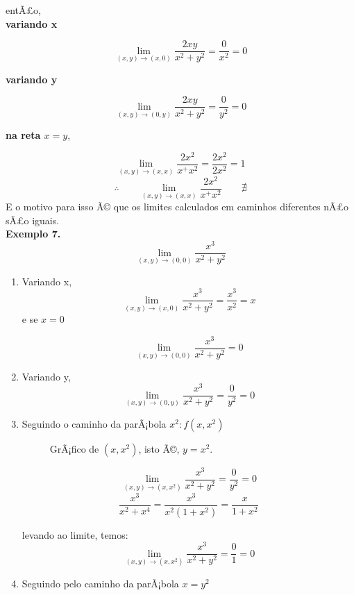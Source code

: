 entÃ£o,\\
\textbf{variando x}

\[\lim_{(x,y)\to(x,0)}\frac{2xy}{x^2+y^2}=\frac{0}{x^2}=0\]

\textbf{variando y}

\[\lim_{(x,y)\to(0,y)}\frac{2xy}{x^2+y^2}=\frac{0}{y^2}=0\]

\textbf{na reta $x=y$},

\[\lim_{(x,y)\rightarrow(x,x)}\frac{2x^2}{x^+x^2}=\frac{2x^2}{2x^2}=1\]
\[\therefore\qquad\lim_{(x,y)\rightarrow(x,x)}\frac{2x^2}{x^+x^2}\qquad\nexists\]
E o motivo para isso Ã© que os limites calculados em caminhos diferentes nÃ£o
sÃ£o iguais.\\
\medskip
\textbf{Exemplo 7.}
\[\lim_{(x,y)\rightarrow(0,0)}\frac{x^3}{x^2+y^2}\]

\begin{enumerate}
    \item Variando x,
    \[\lim_{(x,y)\to(x,0)}\frac{x^3}{x^2+y^2}=\frac{x^3}{x^2}=x\]
    e se $x=0$
    
    \[\lim_{(x,y)\rightarrow(0,0)}\frac{x^3}{x^2+y^2}=0\]
    \item Variando y,
    \[\lim_{(x,y)\rightarrow(0,y)}\frac{x^3}{x^2+y^2}=\frac{0}{y^2}=0\]
    \item Seguindo o caminho da parÃ¡bola $x^2:f(x,x^2)$
    
    \begin{figure}[H]
\centering
{}
\caption{GrÃ¡fico de $(x, x^2)$, isto Ã©, $y=x^2$.}
\end{figure}
\[\lim_{(x,y)\rightarrow(x,x^2)}\frac{x^3}{x^2+y^2}=\frac{0}{y^2}=0\]
\[\frac{x^3}{x^2+x^4}=\frac{x^3}{x^2(1+x^2)}=\frac{x}{1+x^2}\]

levando ao limite, temos:
\[\lim_{(x,y)\rightarrow(x,x^2)}\frac{x^3}{x^2+y^2}=\frac{0}{1}=0\]

\item Seguindo pelo caminho da parÃ¡bola $x=y^2$
\end{enumerate}

